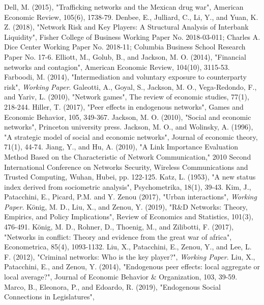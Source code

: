\documentclass[12pt]{article}
\theoremstyle{definition}
\begin{document}
\begin{thebibliography}{99}
	Dell, M. (2015),
	"Trafficking networks and the Mexican drug war",
	American Economic Review, 105(6), 1738-79.
	Denbee, E., Julliard, C., Li, Y., and Yuan, K. Z. (2018),
	"Network Risk and Key Players: A Structural Analysis of Interbank Liquidity",
	Fisher College of Business Working Paper No. 2018-03-011;
	Charles A. Dice Center Working Paper No. 2018-11;
	Columbia Business School Research Paper No. 17-6. 
	Elliott, M., Golub, B., and Jackson, M. O. (2014),
	"Financial networks and contagion",
	American Economic Review, 104(10), 3115-53.
	Farboodi, M. (2014),
	"Intermediation and voluntary exposure to counterparty risk",
	\textit{Working Paper}.
	Galeotti, A., Goyal, S., Jackson, M. O., Vega-Redondo, F., and Yariv, L. (2010),
	"Network games",
	The review of economic studies, 77(1), 218-244.
	Hiller, T. (2017),
	"Peer effects in endogenous networks",
	Games and Economic Behavior, 105, 349-367.
	Jackson, M. O. (2010),
	"Social and economic networks",
	Princeton university press.
	Jackson, M. O., and Wolinsky, A. (1996),
	"A strategic model of social and economic networks",
	Journal of economic theory, 71(1), 44-74.
	Jiang, Y., and Hu, A. (2010),
	"A Link Importance Evaluation Method Based on the Characteristic of Network Communication,"
	2010 Second International Conference on Networks Security, Wireless Communications and Trusted Computing, Wuhan, Hubei, pp. 122-125.
	Katz, L. (1953),
	"A new status index derived from sociometric analysis",
	Psychometrika, 18(1), 39-43.
	Kim, J., Patacchini, E., Picard, P.M. and Y. Zenou (2017),
	"Urban interactions",
	\textit{Working Paper}.
	K\"{o}nig, M. D., Liu, X., and Zenou, Y. (2019),
	"R\&D Networks: Theory, Empirics, and Policy Implications",
	Review of Economics and Statistics, 101(3), 476-491.
	K\"{o}nig, M. D., Rohner, D., Thoenig, M., and Zilibotti, F. (2017),
	"Networks in conflict: Theory and evidence from the great war of africa",
	Econometrica, 85(4), 1093-1132.
	Liu, X., Patacchini, E., Zenou, Y., and Lee, L. F. (2012),
	"Criminal networks: Who is the key player?",
	\textit{Working Paper}.
	Liu, X., Patacchini, E., and Zenou, Y. (2014),
	"Endogenous peer effects: local aggregate or local average?",
	Journal of Economic Behavior \& Organization, 103, 39-59.
	Marco, B., Eleonora, P., and Edoardo, R. (2019),
	"Endogenous Social Connections in Legislatures",

\end{thebibliography}
\end{document}
